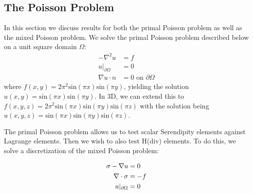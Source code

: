 \documentclass[manuscript,screen]{acmart}
\begin{document}
\subsection{The Poisson Problem}
In this section we discuss results for both the primal Poisson problem as well as the mixed Poisson problem.  We solve the primal Poisson problem described below on a unit square domain $\Omega$:
\begin{align}
    -\nabla^2 u &= f \\
    u\vert_{\partial \Omega} &= 0 \\
    \nabla u \cdot n &= 0 \text{ on } \partial \Omega
\end{align}
where $f(x,y) = 2\pi^2\text{sin}(\pi x)\text{sin}(\pi y) $, yielding the solution $u(x,y) = \text{sin}(\pi x)\text{sin}(\pi y)$. In 3D, we can extend this to $f(x,y,z) = 2\pi^2\text{sin}(\pi x)\text{sin}(\pi y)\text{sin}(\pi z)$ with the solution being $u(x,y,z) = \text{sin}(\pi x)\text{sin}(\pi y)\text{sin}(\pi z)$.  

The primal Poisson problem allows us to test scalar Serendipity elements against Lagrange elements.  Then we wish to also test H(div) elements.  To do this, we solve a discretization of the mixed Poisson problem:

\begin{align}
     \sigma - \nabla u &= 0 \\
     \nabla \cdot \sigma &= -f \notag \\
     u\vert_{\partial \Omega} &= 0 \notag
\end{align}
\end{document}
